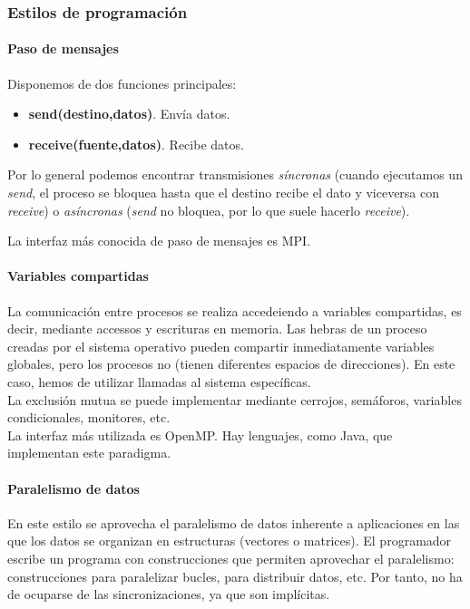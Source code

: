 \documentclass[12pt,spanish]{article}
\begin{document}
\subsubsection{Estilos de programación}

\paragraph{Paso de mensajes}

Disponemos de dos funciones principales:
\begin{itemize}
	\item \textbf{send(destino,datos)}. Envía datos.
	\item \textbf{receive(fuente,datos)}. Recibe datos.
\end{itemize}

Por lo general podemos encontrar transmisiones \emph{síncronas} (cuando ejecutamos un \emph{send}, el proceso se bloquea hasta que el destino recibe el dato y viceversa con \emph{receive}) o \emph{asíncronas} (\emph{send} no bloquea, por lo que suele hacerlo \emph{receive}).

La interfaz más conocida de paso de mensajes es MPI.

\paragraph{Variables compartidas}

La comunicación entre procesos se realiza accedeiendo a variables compartidas, es decir, mediante accessos y escrituras en memoria. Las hebras de un proceso creadas por el sistema operativo pueden compartir inmediatamente variables globales, pero los procesos no (tienen diferentes espacios de direcciones). En este caso, hemos de utilizar llamadas al sistema específicas.\\

La exclusión mutua se puede implementar mediante cerrojos, semáforos, variables condicionales, monitores, etc.\\

La interfaz más utilizada es OpenMP. Hay lenguajes, como Java, que implementan este paradigma.

\paragraph{Paralelismo de datos}

En este estilo se aprovecha el paralelismo de datos inherente a aplicaciones en las que los datos se organizan en estructuras (vectores o matrices). El programador escribe un programa con construcciones que permiten aprovechar el paralelismo: construcciones para paralelizar bucles, para distribuir datos, etc. Por tanto, no ha de ocuparse de las sincronizaciones, ya que son implícitas.\\
\end{document}
